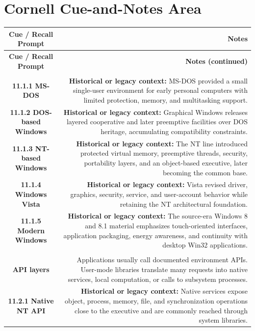\documentclass[10pt,letterpaper]{article}
\begin{document}
\section*{Cornell Cue-and-Notes Area}
\small
\begin{longtable}{C N}
\color{white}\textbf{Cue / Recall Prompt} &
\color{white}\textbf{Notes}\\
\endfirsthead
{}
\color{white}\textbf{Cue / Recall Prompt} &
\color{white}\textbf{Notes (continued)}\\
\endhead
{}\\*\hline
\textbf{11.1.1 MS-DOS} & \textcolor{legacy}{\textbf{Historical or legacy context:}} MS-DOS provided a small single-user environment for early personal computers with limited protection, memory, and multitasking support.\\\hline
\textbf{11.1.2 DOS-based Windows} & \textcolor{legacy}{\textbf{Historical or legacy context:}} Graphical Windows releases layered cooperative and later preemptive facilities over DOS heritage, accumulating compatibility constraints.\\\hline
\textbf{11.1.3 NT-based Windows} & \textcolor{legacy}{\textbf{Historical or legacy context:}} The NT line introduced protected virtual memory, preemptive threads, security, portability layers, and an object-based executive, later becoming the common base.\\\hline
\textbf{11.1.4 Windows Vista} & \textcolor{legacy}{\textbf{Historical or legacy context:}} Vista revised driver, graphics, security, service, and user-account behavior while retaining the NT architectural foundation.\\\hline
\textbf{11.1.5 Modern Windows} & \textcolor{legacy}{\textbf{Historical or legacy context:}} The source-era Windows 8 and 8.1 material emphasizes touch-oriented interfaces, application packaging, energy awareness, and continuity with desktop Win32 applications.\\\hline
{}\\*\hline
\textbf{API layers} & Applications usually call documented environment APIs. User-mode libraries translate many requests into native services, local computation, or calls to subsystem processes.\\\hline
\textbf{11.2.1 Native NT API} & \textcolor{legacy}{\textbf{Historical or legacy context:}} Native services expose object, process, memory, file, and synchronization operations close to the executive and are commonly reached through system libraries.\\\hline

\end{longtable}
\end{document}
